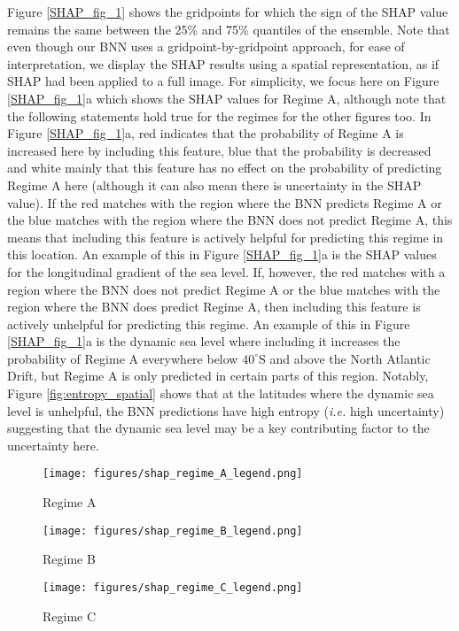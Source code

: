 \documentclass[a4paper]{article}
\begin{document}
Figure \ref{SHAP_fig_1} shows the gridpoints for which the sign of the SHAP value remains the same between the 25\% and 75\% quantiles of the ensemble. Note that even though our BNN uses a gridpoint-by-gridpoint approach, for ease of interpretation, we display the SHAP results using a spatial representation, as if SHAP had been applied to a full image. For simplicity, we focus here on Figure \ref{SHAP_fig_1}a which shows the SHAP values for Regime A, although note that the following statements hold true for the regimes for the other figures too. In Figure \ref{SHAP_fig_1}a, red indicates that the probability of Regime A is increased here by including this feature, blue that the probability is decreased and white mainly that this feature has no effect on the probability of predicting Regime A here (although it can also mean there is uncertainty in the SHAP value). If the red matches with the region where the BNN predicts Regime A or the blue matches with the region where the BNN does not predict Regime A, this means that including this feature is actively helpful for predicting this regime in this location. An example of this in Figure \ref{SHAP_fig_1}a is the SHAP values for the longitudinal gradient of the sea level. If, however, the red matches with a region where the BNN does not predict Regime A or the blue matches with the region where the BNN does predict Regime A, then including this feature is actively unhelpful for predicting this regime. An example of this in Figure \ref{SHAP_fig_1}a is the dynamic sea level where including it increases the probability of Regime A everywhere below $40^{\circ}$S and above the North Atlantic Drift, but Regime A is only predicted in certain parts of this region. Notably, Figure \ref{fig:entropy_spatial} shows that at the latitudes where the dynamic sea level is unhelpful, the BNN predictions have high entropy (\textit{i.e.} high uncertainty) suggesting that the dynamic sea level may be a key contributing factor to the uncertainty here. 

\begin{sidewaysfigure}
\begin{subfigure}{\textwidth}
    \centering
    \texttt{[image: figures/shap\_regime\_A\_legend.png]}
    \caption{Regime A}
    \label{fig:shap_reg_A}
\end{subfigure}
\begin{subfigure}{\textwidth}
    \centering
    \texttt{[image: figures/shap\_regime\_B\_legend.png]}
    \caption{Regime B}
    \label{fig:shap_reg_B}
\end{subfigure}
\begin{subfigure}{\textwidth}
    \centering
    \texttt{[image: figures/shap\_regime\_C\_legend.png]}
    \caption{Regime C}
    \label{fig:shap_reg_C}
\end{subfigure}
\caption{SHAP values which are consistent across the whole ensemble for Regimes A (a), B (b), C (c), D (d), E (e) and F (f). Red indicates that the probability of the Regime here is increased by including this feature and blue that the probability is decreased. White means that the SHAP value is either too uncertain or that the variable has no effect.}\label{SHAP_fig_1}
\end{sidewaysfigure}
\end{document}
